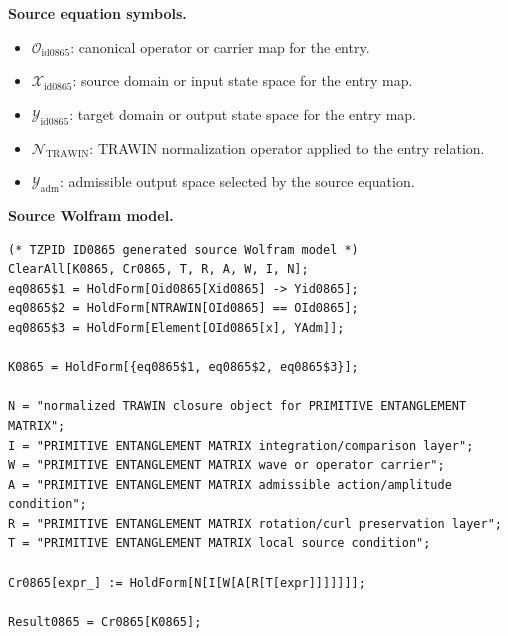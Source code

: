\begin{minipage}[t]{0.49\linewidth}
\begingroup
\small
\raggedright
\textbf{Source equation symbols.}\par
\begin{itemize}[leftmargin=1.35em,itemsep=1pt,topsep=1pt,parsep=0pt]
    \item $\mathcal{O}_{\mathrm{id0865}}$: canonical operator or carrier map for the entry.
    \item $\mathcal{X}_{\mathrm{id0865}}$: source domain or input state space for the entry map.
    \item $\mathcal{Y}_{\mathrm{id0865}}$: target domain or output state space for the entry map.
    \item $\mathcal{N}_{\mathrm{TRAWIN}}$: TRAWIN normalization operator applied to the entry relation.
    \item $\mathcal{Y}_{\mathrm{adm}}$: admissible output space selected by the source equation.
\end{itemize}
\endgroup
\end{minipage}\hfill
\begin{minipage}[t]{0.47\linewidth}
\begingroup
\scriptsize
\raggedright
\textbf{Source Wolfram model.}\par
\begin{Verbatim}[fontsize=\tiny,breaklines=true,breakanywhere=true]
(* TZPID ID0865 generated source Wolfram model *)
ClearAll[K0865, Cr0865, T, R, A, W, I, N];
eq0865$1 = HoldForm[Oid0865[Xid0865] -> Yid0865];
eq0865$2 = HoldForm[NTRAWIN[OId0865] == OId0865];
eq0865$3 = HoldForm[Element[OId0865[x], YAdm]];

K0865 = HoldForm[{eq0865$1, eq0865$2, eq0865$3}];

N = "normalized TRAWIN closure object for PRIMITIVE ENTANGLEMENT MATRIX";
I = "PRIMITIVE ENTANGLEMENT MATRIX integration/comparison layer";
W = "PRIMITIVE ENTANGLEMENT MATRIX wave or operator carrier";
A = "PRIMITIVE ENTANGLEMENT MATRIX admissible action/amplitude condition";
R = "PRIMITIVE ENTANGLEMENT MATRIX rotation/curl preservation layer";
T = "PRIMITIVE ENTANGLEMENT MATRIX local source condition";

Cr0865[expr_] := HoldForm[N[I[W[A[R[T[expr]]]]]]];

Result0865 = Cr0865[K0865];
\end{Verbatim}
\endgroup
\end{minipage}

